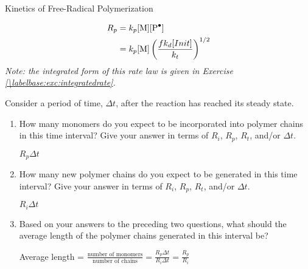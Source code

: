 \begin{activity}{Kinetics of Free-Radical Polymerization}
\begin{ctqs}
\begin{enumerate}
				\begin{solution}[1.5in]{}
					\begin{align*}
						R_p &= k_p\text{[M][\ce{P^.}]}\\
						&= k_p\text{[M]}\left(\frac{fk_d[Init]}{k_t}\right)^{1/2}
					\end{align*}
					\emph{Note: the integrated form of this rate law is given in Exercise \ref{\labelbase:exc:integratedrate}.}
				\end{solution}
			
		\end{enumerate}
	
	\question Consider a period of time, $\Delta t$, after the reaction has reached its steady state.
	
		\begin{enumerate}
			
			\item How many monomers do you expect to be incorporated into polymer chains in this time interval?  Give your answer in terms of $R_i$, $R_p$, $R_t$, and/or $\Delta t$.
			
				\begin{solution}[0.5in]{}
				
					$R_p \Delta t$
					
				\end{solution}
			
			\item How many new polymer chains do you expect to be generated in this time interval?  Give your answer in terms of $R_i$, $R_p$, $R_t$, and/or $\Delta t$.
			
				\begin{solution}[0.5in]{}
				
					$R_i \Delta t$
					
				\end{solution}
			
			\item Based on your answers to the preceding two questions, what should the average length of the polymer chains generated in this interval be?
			
				\begin{solution}[1in]{}
				
					Average length = $\frac{\text{number of monomers}}{\text{number of chains}} = \frac{R_p\Delta t}{R_i \Delta t} = \frac{R_p}{R_i}$				
				
				\end{solution}
				
		\end{enumerate}
	

\end{ctqs}
\end{activity}
